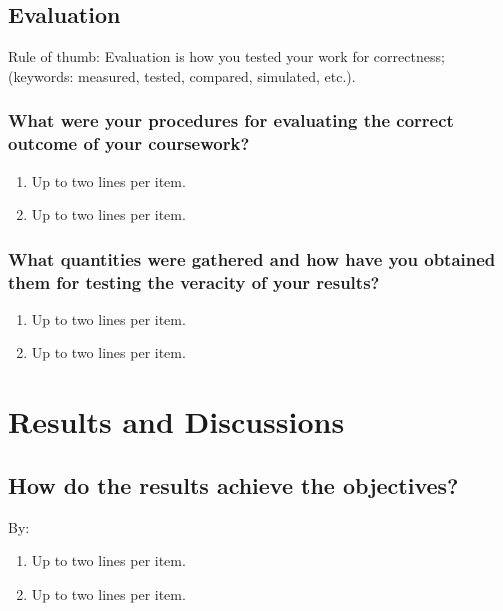 \subsection{Evaluation}
\label{sec:eval}

Rule of thumb: Evaluation is how you tested your work for correctness; (keywords: measured, tested, compared, simulated, etc.).

\subsubsection{What were your procedures for evaluating the correct outcome of your coursework?}
\begin{enumerate}
\item Up to two lines per item.
\item Up to two lines per item.
\end{enumerate}
	
\subsubsection{What quantities were gathered and how have you obtained them for testing the veracity of your results?}
\begin{enumerate}
\item Up to two lines per item.
\item Up to two lines per item.
\end{enumerate}




















\section{Results and Discussions}

\subsection{How do the results achieve the objectives?}
By:
\begin{enumerate}
\item Up to two lines per item.
\item Up to two lines per item.
\end{enumerate}
	
